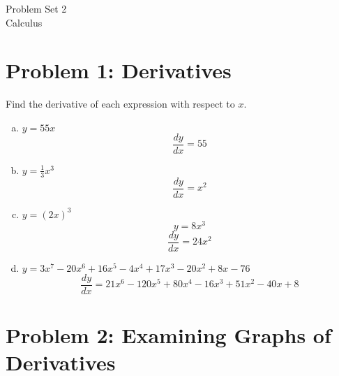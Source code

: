 \documentclass[11pt]{article}
\theoremstyle{definition}
\theoremstyle{remark}
\begin{document}
\begin{center}
{\huge Problem Set 2}\\[5pt]
{\Large Calculus}
\end{center}

\section*{Problem 1: Derivatives}
 Find the derivative of each expression with respect to $x$.
\begin{enumerate}[(a)]
\item $ \displaystyle y=55x$
{\color{red} $$\frac{dy}{dx} = 55 $$}
\item $ \displaystyle y=\frac{1}{3}x^3$
{\color{red} $$ \frac{dy}{dx} = x^2 $$}
\item $ \displaystyle y=(2x)^3$
{\color{red} $$ y = 8x^3 $$
$$\frac{dy}{dx} = 24x^2$$}
\item $ \displaystyle y= 3x^7 - 20x^6 + 16x^5 - 4x^4 + 17x^3 - 20x^2 + 8x - 76$
{\color{red} $$\frac{dy}{dx} = 21x^6 - 120x^5 + 80x^4 - 16x^3 + 51x^2 - 40x + 8$$}
\end{enumerate}

\section*{Problem 2: Examining Graphs of Derivatives}
 
\end{document}
